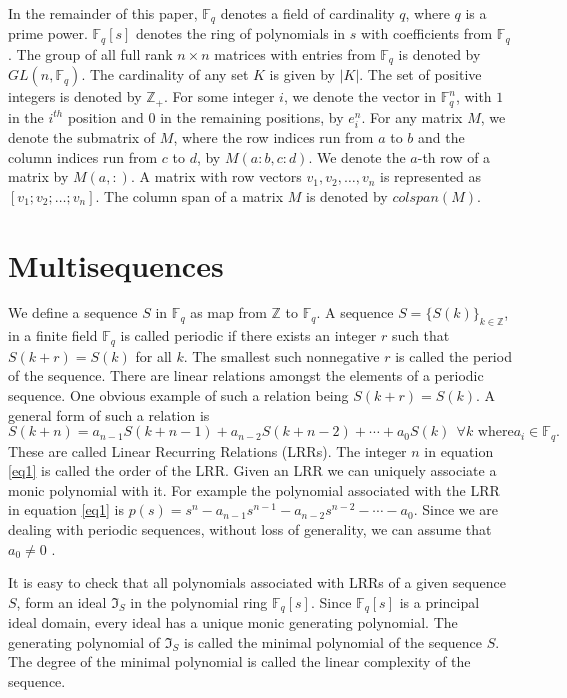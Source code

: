 \documentclass[letterpaper, 12 pt]{article}  \usepackage{amssymb}
\newcommand{\F}{\mathbb{F}}
\begin{document}
In the remainder of this paper, $\F_q$ denotes a field of cardinality $q$, where
$q$ is a prime power. $\F_q[s]$ denotes the ring of polynomials in $s$ with
coefficients from $\F_q$. The group of all full rank $n \times n$ matrices with
entries from $\F_q$ is denoted by $GL(n,\F_q)$. The cardinality of any set
$K$ is given by $|K|$. The set of positive integers is denoted by
$\mathbb{Z}_+$.
For some integer $i$, we denote the vector in
$\F_q^n$, with $1$ in the $i^{th}$ position and $0$ in the remaining positions,
by $e_i^n$. For any matrix $M$, we denote the submatrix of $M$, where
 the row indices run from $a$ to $b$ and the column indices run from $c$ to
 $d$, by $M(a:b,c:d)$. We denote the $a$-th row of a matrix by $M(a,:)$. A matrix with row vectors $v_1,v_2,
\ldots, v_n$ is represented as $[v_1;v_2;\ldots;v_n]$. The column span of a
matrix $M$ is
denoted by $colspan(M)$. 
\section{Multisequences }
\label{Multisequences}






We define a sequence $S$ in $\F_q$ as map from $\mathbb{Z}$ to $\F_q$. 
A sequence $S =\{S(k)\}_{k \in \mathbb{Z}}$, in a finite field $\F_q$
is called periodic if there exists an integer $r$ such that $S(k+r) = S(k)$ for
all $k$. 
The smallest such nonnegative $r$ is called the period of the sequence. There
are linear relations amongst the elements of a periodic sequence. One obvious
example of such a relation being $S(k+r) = S(k)$. A general form of such a
relation is
{\small
\begin{equation}
\label{eq1}
S(k+n) = a_{n-1}S(k+n-1) + a_{n-2}S(k+n-2) + \cdots + a_0S(k) ~~ \forall k
\textrm{ where
}
a_i \in \F_q.
\end{equation}
}
These are called  Linear Recurring Relations (LRRs). The integer $n$ in equation
\eqref{eq1} is called the
order of the LRR. Given an LRR we can uniquely associate a monic polynomial
with it. For example the polynomial associated with the LRR in equation
\eqref{eq1} is $p(s) =  s^n - a_{n-1}s^{n-1} - a_{n-2}s^{n-2} - \cdots - a_0 $.
Since we are dealing with periodic sequences, without loss of generality, we can
assume that $a_0 \neq 0$  \cite[Theorem 6.11]{lidl}.

It is easy to check that all polynomials associated with LRRs of a given
sequence $S$, form an ideal $\mathfrak{I}_S$ in the polynomial ring $\F_q[s]$.
Since $\F_q[s]$ is a principal ideal domain, every ideal has a unique monic
generating polynomial. The generating polynomial of $\mathfrak{I}_S$ is called
the minimal polynomial of the sequence $S$.
The degree of the minimal polynomial is called the linear complexity of the
sequence. 
\end{document}
